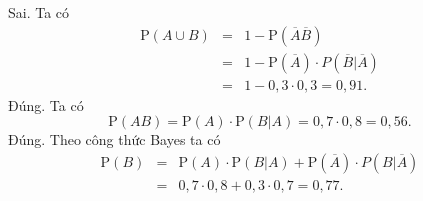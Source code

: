 \begin{ex}
{\begin{itemchoice}
			\itemch Sai. Ta có
			\begin{eqnarray*}
				\mathrm{P}(A \cup B) &=& 1-\mathrm{P}\left(\overline{A} \overline {B}\right)\\
				&=& 1- \mathrm{P}\left(\overline{A}\right) \cdot P\left( \overline{B} \big| \overline{A}\right)\\
				&=&1- 0{,}3 \cdot 0{,}3= 0{,}91.
			\end{eqnarray*}
			\itemch Đúng. Ta có
			\[
			\mathrm{P}(AB)= \mathrm{P}(A) \cdot \mathrm{P}(B|A)= 0{,}7\cdot 0{,}8= 0{,}56.
			\]
			\itemch Đúng. Theo công thức Bayes ta có
			\begin{eqnarray*}
				\mathrm{P}(B) &=& \mathrm{P}(A) \cdot \mathrm{P}(B|A) +\mathrm{P}\left(\overline{A}\right) \cdot P\left(B|\overline{A}\right)\\
				&=& 0{,}7 \cdot 0{,}8+ 0{,}3\cdot 0{,}7= 0{,}77.
			\end{eqnarray*}			
		\end{itemchoice}
	}
\end{ex}

